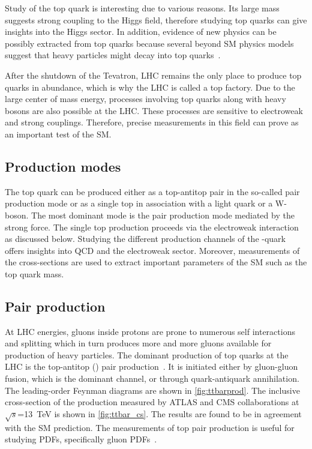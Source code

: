 Study of the top quark is interesting due to various reasons. Its large mass suggests strong coupling to
the Higgs field, therefore studying top quarks can give insights into the Higgs sector. In addition, 
evidence of new physics can be possibly extracted from top quarks because
several beyond SM physics models suggest that heavy particles might decay into top quarks~\cite{Gallinaro_2013}.

After the shutdown of the Tevatron, LHC remains the only place to produce top quarks in abundance,
which is why the LHC is called a top factory. Due to the large center of mass energy, processes
involving top quarks along with heavy bosons are also possible at the LHC. These processes
are sensitive to electroweak and strong couplings. Therefore, precise measurements in this field
can prove as an important test of the SM.


\subsection{Production modes}
The top quark can be produced either as a top-antitop pair in the so-called pair production mode
or as a single top in association with a light quark or a W-boson. The most dominant mode
is the pair production mode mediated by the strong force. The single top production proceeds via
the electroweak interaction as discussed below. Studying the different production channels of the
\Ptop-quark offers insights into QCD and the electroweak sector. Moreover, measurements of the 
cross-sections are used to extract important parameters of the SM such as the top quark mass. 



\subsection*{Pair production}
At LHC energies, gluons inside protons are prone to numerous self interactions and splitting which in 
turn produces more and more gluons available for production of heavy particles. 
The dominant production of top quarks at the LHC is the top-antitop (\ttbar) pair production~\cite{ATLAS:2016zet}. It is
initiated either by gluon-gluon fusion, which is the dominant channel, or through quark-antiquark annihilation.
The leading-order Feynman diagrams are shown in \cref{fig:ttbarprod}. The inclusive cross-section
of the \ttbar production measured by ATLAS and CMS collaborations at $\sqrt{s}$=\qty{13}{\TeV} is
shown in \cref{fig:ttbar_cs}. The results are found to be in agreement with the SM prediction.
The measurements of top pair production is useful for studying PDFs, specifically 
gluon PDFs~\cite{FABBRI201763}.

